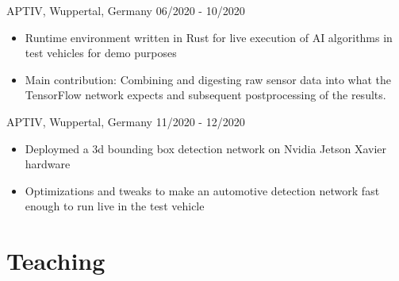 \documentclass[singlesided,
               paper=a4,
               fontsize=10pt
              ]{my-resume}
\begin{document}
    {APTIV, Wuppertal, Germany}
    {06/2020 - 10/2020}
    {\begin{itemize}
        \item Runtime environment written in Rust for live execution of AI algorithms in test vehicles for demo purposes
        \item Main contribution: Combining and digesting raw sensor data into what the TensorFlow network expects and subsequent postprocessing of the results. 
    \end{itemize}}
    {APTIV, Wuppertal, Germany}
    {11/2020 - 12/2020}
    {\begin{itemize}
        \item Deploymed a 3d bounding box detection network on Nvidia Jetson Xavier hardware 
        \item Optimizations and tweaks to make an automotive detection network fast enough to run live in the test vehicle
    \end{itemize}}


\section[\faBook]{Teaching}
\end{document}
